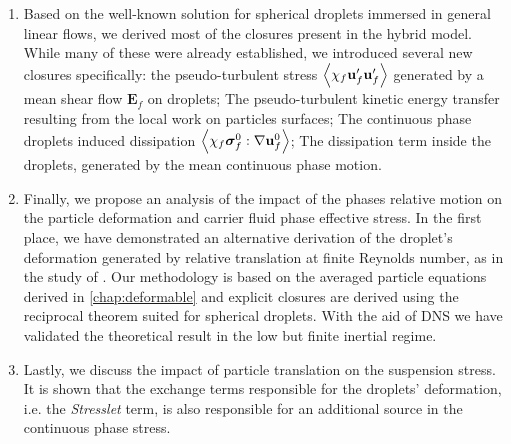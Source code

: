 \begin{enumerate}
    \item Based on the well-known solution for spherical droplets immersed in general linear flows, we derived most of the closures present in the hybrid model. 
    While many of these were already established, we introduced several new closures specifically: 
    the pseudo-turbulent stress $\left<\chi_f \textbf{u}_f'\textbf{u}_f'\right>$ generated by a mean shear flow $\textbf{E}_f$ on droplets; 
    The pseudo-turbulent kinetic energy transfer resulting from the local work on particles surfaces; 
    The continuous phase droplets induced dissipation $\left<\chi_f \bm\sigma_f^0:\mathbf{\nabla} \textbf{u}_f^0\right>$; 
    The dissipation term inside the droplets, generated by the mean continuous phase motion. 
    \item Finally, we propose an analysis of the impact of the phases relative motion on the particle deformation and carrier fluid phase effective stress. 
    In the first place, we have demonstrated an alternative derivation of the droplet's deformation generated by relative translation at finite Reynolds number, as in the study of \citet{taylor1964deformation}. 
    Our methodology is based on the averaged particle equations derived in \ref{chap:deformable} and explicit closures are derived using the reciprocal theorem suited for spherical droplets. 
    With the aid of DNS we have validated the theoretical result in the low but finite inertial regime. 
    \item 
    Lastly, we discuss the impact of particle translation on the suspension stress. 
    It is shown that the exchange terms responsible for the droplets' deformation, i.e. the \textit{Stresslet} term, is also responsible for an additional source in the continuous phase stress. 

\end{enumerate}
